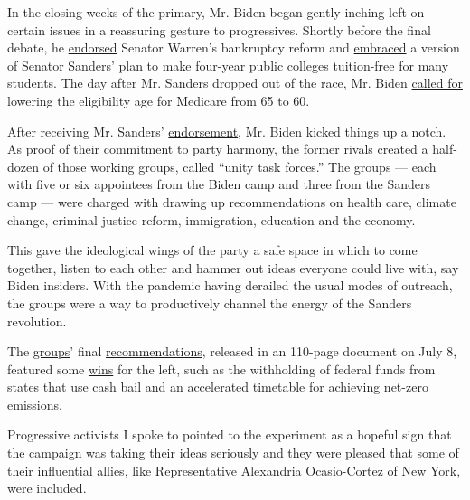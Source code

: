 In the closing weeks of the primary, Mr. Biden began gently inching left
on certain issues in a reassuring gesture to progressives. Shortly
before the final debate, he
\href{https://www.vox.com/2020/3/16/21181500/joe-biden-elizabeth-warren-bankruptcy}{endorsed}
Senator Warren's bankruptcy reform and
\href{https://www.nytimes.com/2020/03/15/us/politics/biden-backs-free-college.html}{embraced}
a version of Senator Sanders' plan to make four-year public colleges
tuition-free for many students. The day after Mr. Sanders dropped out of
the race, Mr. Biden
\href{https://www.npr.org/sections/health-shots/2020/04/11/832025550/bidens-health-play-in-a-covid-19-economy-lower-medicares-eligibility-age-to-60}{called
for} lowering the eligibility age for Medicare from 65 to 60.

After receiving Mr. Sanders'
\href{https://www.nytimes.com/2020/04/13/us/politics/bernie-sanders-joe-biden-endorsement.html}{endorsement},
Mr. Biden kicked things up a notch. As proof of their commitment to
party harmony, the former rivals created a half-dozen of those working
groups, called ``unity task forces.'' The groups --- each with five or
six appointees from the Biden camp and three from the Sanders camp ---
were charged with drawing up recommendations on health care, climate
change, criminal justice reform, immigration, education and the economy.

This gave the ideological wings of the party a safe space in which to
come together, listen to each other and hammer out ideas everyone could
live with, say Biden insiders. With the pandemic having derailed the
usual modes of outreach, the groups were a way to productively channel
the energy of the Sanders revolution.

The
\href{https://www.nytimes.com/aponline/2020/07/08/us/politics/ap-us-election-2020-biden.html}{groups}'
final
\href{https://joebiden.com/wp-content/uploads/2020/07/UNITY-TASK-FORCE-RECOMMENDATIONS.pdf}{recommendations},
released in an 110-page document on July 8, featured some
\href{https://www.politico.com/news/2020/07/08/biden-legal-marijuana-police-protections-353585?nname=playbook\&nid=0000014f-1646-d88f-a1cf-5f46b7bd0000\&nrid=00000163-9937-d365-aff3-fdbffcd70000\&nlid=630318}{wins}
for the left, such as the withholding of federal funds from states that
use cash bail and an accelerated timetable for achieving net-zero
emissions.

Progressive activists I spoke to pointed to the experiment as a hopeful
sign that the campaign was taking their ideas seriously and they were
pleased that some of their influential allies, like Representative
Alexandria Ocasio-Cortez of New York, were included.


